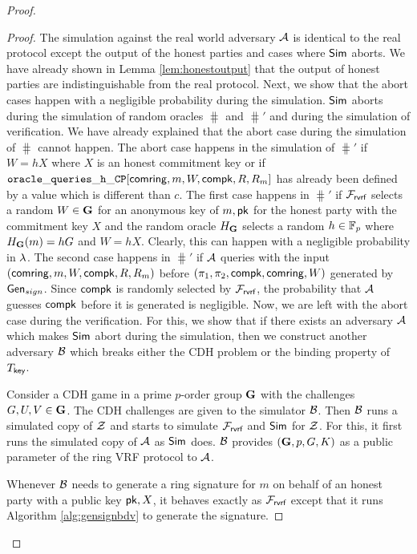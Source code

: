 \begin{proof}
		
		\begin{proof}
			The  simulation against the real world adversary $ \mathcal{A} $ is identical to the real protocol except the output of the honest parties and cases where $ \mathsf{Sim} $ aborts. We have already shown in Lemma \ref{lem:honestoutput} that the output of honest parties are indistinguishable from the real protocol. Next, we show that the abort cases happen with a negligible probability during the simulation. $ \mathsf{Sim} $ aborts during the simulation of random oracles $ \hash $ and $ \hash' $ and during the simulation of verification. We have already explained that the abort case during the simulation of $ \hash $ cannot happen. The abort case happens in the simulation of $ \hash' $ if $ W = hX $ where $ X $ is an honest commitment key or if $ \mathtt{oracle\_queries\_h\_CP}[\mathsf{comring},m,W,\mathsf{compk},R,R_m] $ has already been defined by a value which is different than $ c $. The first case happens in $ \hash' $ if $ \mathcal{F}_{\textsf{rvrf}} $ selects a random $ W \in {\mathbf{G}}$ for an anonymous key of $ m, \mathsf{pk}  $ for the honest party with the commitment key $ X $ and the random oracle $ H_{\mathbf{G}} $ selects a random $ h \in \mathbb{F}_p  $ where $ H_{\mathbf{G}}(m) = hG $ and $ W = hX $. Clearly, this can happen with a negligible probability in $ \lambda $. The 
			second case happens in $ \hash' $ if $ \mathcal{A} $ queries with the input $ (\mathsf{comring},m,W,\mathsf{compk},R,R_m) $ before $ (\pi_1,\pi_2,\mathsf{compk},\mathsf{comring},W) $ generated by $ \mathsf{Gen}_{sign} $. Since $ \mathsf{compk} $ is randomly selected by $ \mathcal{F}_{\textsf{rvrf}} $, the probability that $ \mathcal{A} $ guesses $ \mathsf{compk} $ before it is generated is negligible.
			Now, we are left with the abort case during the verification.
			For this, we show that if there exists an adversary $ \mathcal{A} $ which makes $ \mathsf{Sim} $ abort during the simulation, then we construct another adversary $ \mathcal{B} $ which breaks either the CDH problem or the binding property of $ T_{\mathsf{key}} $. 
			
			Consider a CDH game in a prime $ p $-order group  $ {\mathbf{G}} $ with the challenges $ G,U, V \in {\mathbf{G}}$. The CDH challenges are given to the simulator $ \mathcal{B} $. Then $ \mathcal{B} $ runs a simulated copy of $ \mathcal{Z} $ and starts to simulate $ \mathcal{F}_{\textsf{rvrf}} $ and $ \mathsf{Sim} $ for $ \mathcal{Z} $. For this, it first runs the simulated copy of $ \mathcal{A} $ as $ \mathsf{Sim} $ does. $ \mathcal{B} $ provides $ ({\mathbf{G}}, p, G , K) $ as a public parameter of the ring VRF protocol to $ \mathcal{A} $.
			
			Whenever $ \mathcal{B} $ needs to generate a ring signature for $ m $ on behalf of an honest party with a public key $ \mathsf{pk},X $, it behaves exactly as $ \mathcal{F}_{\textsf{rvrf}} $ except that it runs   Algorithm \ref{alg:gensignbdv} to generate the signature. 
			

\end{proof}
\end{proof}
